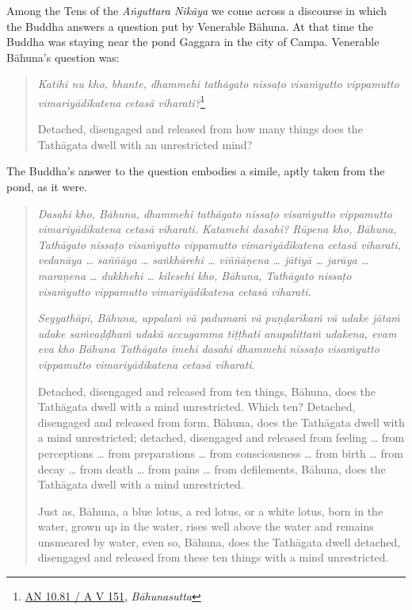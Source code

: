 Among the Tens of the \emph{Aṅguttara Nikāya} we come across a discourse in which the Buddha answers a question put by Venerable Bāhuna. At that time the Buddha was staying near the pond Gaggara in the city of Campa. Venerable Bāhuna's question was:

\enlargethispage{\baselineskip}

\begin{quote}
\emph{Katīhi nu kho, bhante, dhammehi tathāgato nissaṭo visaṁyutto vippamutto vimariyādikatena cetasā viharati?}\footnote{\href{https://suttacentral.net/an10.81/pli/ms}{AN 10.81 / A V 151}, \emph{Bāhunasutta}}

Detached, disengaged and released from how many things does the Tathāgata dwell with an unrestricted mind?
\end{quote}

The Buddha's answer to the question embodies a simile, aptly taken from the pond, as it were.

\begin{quote}
\emph{Dasahi kho, Bāhuna, dhammehi tathāgato nissaṭo visaṁyutto vippamutto vimariyādikatena cetasā viharati. Katamehi dasahi? Rūpena kho, Bāhuna, Tathāgato nissaṭo visaṁyutto vippamutto vimariyādikatena cetasā viharati, vedanāya \ldots{} saññāya \ldots{} saṅkhārehi \ldots{} viññāṇena \ldots{} jātiyā \ldots{} jarāya \ldots{} maraṇena \ldots{} dukkhehi \ldots{} kilesehi kho, Bāhuna, Tathāgato nissaṭo visaṁyutto vippamutto vimariyādikatena cetasā viharati.}

\emph{Seyyathāpi, Bāhuna, uppalaṁ vā padumaṁ vā puṇḍarīkaṁ vā udake jātaṁ udake saṁvaḍḍhaṁ udakā accugamma tiṭṭhati anupalittaṁ udakena, evam eva kho Bāhuna Tathāgato imehi dasahi dhammehi nissaṭo visaṁyutto vippamutto vimariyādikatena cetasā viharati}.

Detached, disengaged and released from ten things, Bāhuna, does the Tathāgata dwell with a mind unrestricted. Which ten? Detached, disengaged and released from form, Bāhuna, does the Tathāgata dwell with a mind unrestricted; detached, disengaged and released from feeling \ldots{} from perceptions \ldots{} from preparations \ldots{} from consciousness \ldots{} from birth \ldots{} from decay \ldots{} from death \ldots{} from pains \ldots{} from defilements, Bāhuna, does the Tathāgata dwell with a mind unrestricted.

Just as, Bāhuna, a blue lotus, a red lotus, or a white lotus, born in the water, grown up in the water, rises well above the water and remains unsmeared by water, even so, Bāhuna, does the Tathāgata dwell detached, disengaged and released from these ten things with a mind unrestricted.
\end{quote}

